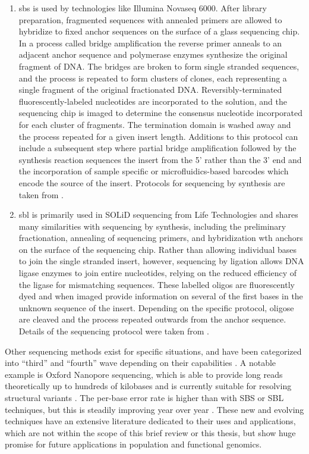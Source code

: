 \begin{enumerate}
    \item \Gls{sbs} is used by technologies like Illumina Novaseq 6000. After library preparation, fragmented sequences with annealed primers are allowed to hybridize to fixed anchor sequences on the surface of a glass sequencing chip. In a process called bridge amplification the reverse primer anneals to an adjacent anchor sequence and polymerase enzymes synthesize the original fragment of DNA. The bridges are broken to form single stranded sequences, and the process is repeated to form clusters of clones, each representing a single fragment of the original fractionated DNA. Reversibly-terminated fluorescently-labeled nucleotides are incorporated to the solution, and the sequencing chip is imaged to determine the consensus nucleotide incorporated for each cluster of fragments. The termination domain is washed away and the process repeated for a given insert length. Additions to this protocol can include a subsequent step where partial bridge amplification followed by the synthesis reaction sequences the insert from the 5' rather than the 3' end and the incorporation of sample specific or microfluidics-based barcodes which encode the source of the insert. Protocols for sequencing by synthesis are taken from \textcite{Illumina}.
    \item \Gls{sbl} is primarily used in SOLiD sequencing from Life Technologies and shares many similarities with sequencing by synthesis, including the preliminary fractionation, annealing of sequencing primers, and hybridization wth anchors on the surface of the sequencing chip. Rather than allowing individual bases to join the single stranded insert, however, sequencing by ligation allows DNA ligase enzymes to join entire nucleotides, relying on the reduced efficiency of the ligase for mismatching sequences. These labelled oligos are fluorescently dyed and when imaged provide information on several of the first bases in the unknown sequence of the insert. Depending on the specific protocol, oligose are cleaved and the process repeated outwards from the anchor sequence. Details of the sequencing protocol were taken from \textcite{Slatko2018}.
\end{enumerate}

Other sequencing methods exist for specific situations, and have been categorized into ``third'' and ``fourth'' wave depending on their capabilities \cite{Slatko2018}. A notable example is Oxford Nanopore sequencing, which is able to provide long reads theoretically up to hundreds of kilobases and is currently suitable for resolving structural variants \cite{AByrne2019,Bayega2018}. The per-base error rate is higher than with SBS or SBL techniques, but this is steadily improving year over year \cite{Sahlin2021}. These new and evolving techniques have an extensive literature dedicated to their uses and applications, which are not within the scope of this brief review or this thesis, but show huge promise for future applications in population and functional genomics. 

